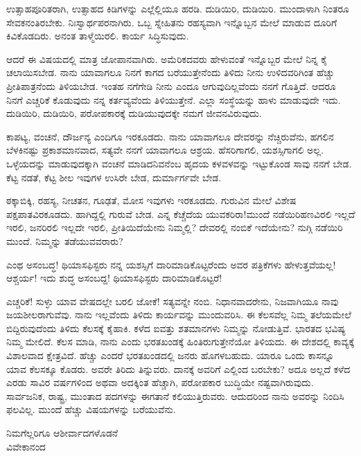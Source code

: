 ಉತ್ಸಾಹಪೂರಿತರಾಗಿ, ಉತ್ಸಾಹದ ಕಿಡಿಗಳನ್ನು ಎಲ್ಲೆಲ್ಲಿಯೂ ಹರಡಿ. ದುಡಿಯಿರಿ, ದುಡಿಯಿರಿ. ಮುಂದಾಳಾಗಿ ನಿಂತರೂ ಸೇವಕನಂತಿರಬೇಕು. ನಿಃಸ್ವಾರ್ಥಪರನಾಗಿರು. ಒಬ್ಬ ಸ್ನೇಹಿತನು ರಹಸ್ಯವಾಗಿ ಇನ್ನೊಬ್ಬನ ಮೇಲೆ ಮಾಡುವ ದೂರಿಗೆ ಕಿವಿಕೊಡದಿರು. ಅನಂತ ತಾಳ್ಮೆಯಿರಲಿ. ಕಾರ್ಯ ಸಿದ್ಧಿಸುವುದು.

ಆದರೆ ಈ ವಿಷಯದಲ್ಲಿ ಮಾತ್ರ ಜೋಪಾನವಾಗಿರು. ಅಮೆರಿಕದವರು ಹೇಳುವಂತೆ ಇನ್ನೊಬ್ಬರ ಮೇಲೆ ನಿನ್ನ ಕೈ ಚಲಾಯಿಸಬೇಡ. ನಾನು ಯಾವಾಗಲೂ ನಿನಗೆ ಕಾಗದ ಬರೆಯುತ್ತೇನೆಂದು ತಿಳಿದು ನೀನು ಉಳಿದವರಿಗಿಂತ ಹೆಚ್ಚು ಪ್ರೀತಿಪಾತ್ರನೆಂದು ತಿಳಿಯಬೇಡ. ಇಂತಹ ನಗೆಗೇಡಿ ನೀನು ಎಂದೂ ಆಗುವುದಿಲ್ಲವೆಂದು ನನಗೆ ಗೊತ್ತಿದೆ. ಆದರೂ ನಿನಗೆ ಎಚ್ಚರಿಕೆ ಕೊಡುವುದು ನನ್ನ ಕರ್ತವ್ಯವೆಂದು ತಿಳಿಯುತ್ತೇನೆ. ಎಲ್ಲಾ ಸಂಸ್ಥೆಯನ್ನು ಹಾಳು ಮಾಡುವುದೇ ಇದು. ದುಡಿಯಿರಿ, ದುಡಿಯಿರಿ, ಪರೋಪಕಾರಕ್ಕೆ ದುಡಿಯುವುದಕ್ಕೇ ನಮಗೆ ಜೀವನವಿರುವುದು.

ಕಾಪಟ್ಯ, ವಂಚನೆ, ದೌರ್ಜನ್ಯ ಎಂದಿಗೂ ಇರಕೂಡದು. ನಾನು ಯಾವಾಗಲೂ ದೇವರನ್ನು ನೆಚ್ಚಿರುವೆನು, ಹಗಲಿನ ಬೆಳಕಿನಷ್ಟು ಪ್ರಕಾಶಮಾನವಾದ, ಸತ್ಯವೇ ನನಗೆ ಯಾವಾಗಲೂ ಆಶ್ರಯ. ಹೆಸರಿಗಾಗಲಿ, ಯಶಸ್ಸಿಗಾಗಲಿ ಅಲ್ಲ. ಒಳ್ಳೆಯದನ್ನು ಮಾಡುವುದಕ್ಕಾಗಿ ವಂಚನೆ ಮಾಡಿದನಿವನೆಂಬ ಹೃದಯ ಕಳವಳವನ್ನು ಇಟ್ಟುಕೊಂಡ ಸಾವು ನನಗೆ ಬೇಡ. ಕೆಟ್ಟ ನಡತೆ, ಕೆಟ್ಟ ಶೀಲ ಇವುಗಳ ಉಸಿರೇ ಬೇಡ, ದುರ್ಮಾರ್ಗವೇ ಬೇಡ.

ಠಕ್ಕಾಬಿಕ್ಕಿ, ರಹಸ್ಯ, ನೀಚತನ, ಗೂಢತೆ, ಮೋಸ ಇವುಗಳು ಇರಕೂಡದು. ಗುರುವಿನ ಮೇಲೆ ವಿಶೇಷ ಪಕ್ಷಪಾತವಿರಕೂಡದು. ಹಾಗಿದ್ದಲ್ಲಿ ಗುರುವೆ ಬೇಡ. ಎನ್ನ ಕೆಚ್ಚೆದೆಯ ಯುವಕರಿರಾ!ಮುಂದೆ ನಡೆಯಿರಿ\enginline{-}ಹಣವಿರಲಿ ಇಲ್ಲದೆ ಇರಲಿ, ಜನರಿರಲಿ ಇಲ್ಲದೇ ಇರಲಿ, ಪ್ರೀತಿಯಿದೆಯೇನು ನಿಮ್ಮಲ್ಲಿ? ದೇವರಲ್ಲಿ ನಂಬಿಕೆ ಇದೆಯೇನು? ನುಗ್ಗಿ ನಡೆಯಿರಿ ಮುಂದೆ. ನಿಮ್ಮನ್ನು ತಡೆಯುವವರಾರು?

ಎಂಥ ಅಸಂಬದ್ಧ! ಥಿಯಾಸಫಿಸ್ಟರು ನನ್ನ ಯಶಸ್ಸಿಗೆ ದಾರಿಮಾಡಿಕೊಟ್ಟರೆಂದು ಅವರ ಪತ್ರಿಕೆಗಳು ಹೇಳುತ್ತವೆಯಲ್ಲ! ಆಶ್ಚರ್ಯ! ಇದು ಶುದ್ಧ ಅಸಂಬದ್ದ! ಥಿಯಾಸಫಿಸ್ಟರು ದಾರಿಮಾಡಿಕೊಟ್ಟರೆ!

ಎಚ್ಚರಿಕೆ! ಸುಳ್ಳು ಯಾವ ವೇಷದಲ್ಲೇ ಬರಲಿ ಜೋಕೆ! ಸತ್ಯವನ್ನೇ ನಂಬಿ. ನಿಧಾನವಾದರೇನು, ನಿಜವಾಗಿಯೂ ನಾವು ಜಯಶೀಲರಾಗುವೆವು. ನಾನು ಇಲ್ಲವೆಂದು ತಿಳಿದು ಕಾರ್ಯವನ್ನು ಮುಂದುವರಿಸಿ. ಈ ಕೆಲಸವೆಲ್ಲ ನಿಮ್ಮ ತಲೆಯಮೇಲೆ ಬಿದ್ದಿರುವುದೆಂದು ತಿಳಿದು ಕೆಲಸಕ್ಕೆ ಕೈಹಾಕಿ. ಕಳೆದ ಐವತ್ತು ಶತಮಾನಗಳು ನಿಮ್ಮನ್ನು ನೋಡುತ್ತಿವೆ. ಭಾರತದ ಭವಿಷ್ಯ ನಿಮ್ಮ ಮೇಲಿದೆ. ಕೆಲಸ ಮಾಡಿ, ನಾನು ಎಂದು ಭರತಖಂಡಕ್ಕೆ ಹಿಂತಿರುಗುತ್ತೇನೆಯೋ ತಿಳಿಯದು. ಈ ದೇಶದಲ್ಲಿ ಕಾವ್ಯಕ್ಕೆ ವಿಶಾಲವಾದ ಕ್ಷೇತ್ರವಿದೆ. ಹೆಚ್ಚು ಎಂದರೆ ಭರತಖಂಡದಲ್ಲಿ ಜನರು ಹೊಗಳಬಹುದು. ಯಾರೂ ಒಂದು ಕಾಸನ್ನೂ ಯಾವ ಕೆಲಸಕ್ಕೂ ಕೊಡರು. ಅವರೇ ತಿರಿದು ತಿನ್ನುವರು. ದಾನಕ್ಕೆ ಅವರಿಗೆ ಎಲ್ಲಿಂದ ಬರಬೇಕು? ಅದೂ ಅಲ್ಲದೆ ಕಳೆದ ಎರಡು ಸಾವಿರ ವರ್ಷಗಳಿಂದ ಅಥವಾ ಅದಕ್ಕಿಂತ ಹೆಚ್ಚಾಗಿ, ಪರೋಪಕಾರ ಬುದ್ಧಿಯೇ ನಷ್ಟವಾಗಿರುವುದು. ಸಾರ್ವಜನಿಕ, ರಾಷ್ಟ್ರ, ಮುಂತಾದ ಪದಗಳನ್ನು ಈಗತಾನೆ ಕಲಿಯುತ್ತಿರುವರು. ಆದುದರಿಂದ ನಾನು ಅವರನ್ನು ನಿಂದಿಸಿ ಫಲವಿಲ್ಲ. ಮುಂದೆ ಹೆಚ್ಚು ವಿಷಯಗಳನ್ನು ಬರೆಯುವೆನು.
\vspace{-0.3cm}

{\flushright
ನಿಮಗೆಲ್ಲರಿಗೂ ಆಶೀರ್ವಾದಗಳೊಡನೆ\\ವಿವೇಕಾನಂದ\par}
\vspace{-0.3cm}

